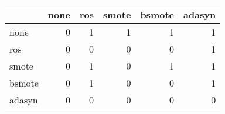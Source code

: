 \begin{tabular}{lrrrrr}
\hline
        &   none &   ros &   smote &   bsmote &   adasyn \\
\hline
 none   &      0 &     1 &       1 &        1 &        1 \\
 ros    &      0 &     0 &       0 &        0 &        1 \\
 smote  &      0 &     1 &       0 &        1 &        1 \\
 bsmote &      0 &     1 &       0 &        0 &        1 \\
 adasyn &      0 &     0 &       0 &        0 &        0 \\
\hline
\end{tabular}